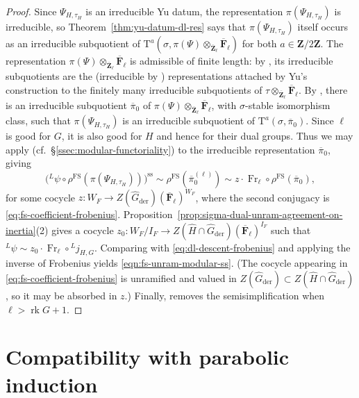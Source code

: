 \documentclass[reqno]{amsart}
\numberwithin{equation}{subsection}
\newcommand{\F}{\mathbf{F}}
\newcommand{\Z}{\mathbf{Z}}
\newcommand{\ol}[1]{\overline{#1}}
\newcommand{\wh}[1]{\widehat{#1}}
\newcommand{\co}{\colon}
\newcommand{\ld}{{}^L}
\DeclareMathOperator{\FS}{FS}
\DeclareMathOperator{\der}{der}
\DeclareMathOperator{\rk}{rk}
\DeclareMathOperator{\Fr}{Fr}
\newcommand{\rT}{\ensuremath{\mathrm{T}}\xspace}
\renewcommand{\ss}{\mathrm{ss}}
\theoremstyle{remark}
\numberwithin{equation}{subsection}
\numberwithin{figure}{subsection}
\begin{document}
\begin{proof}
Since $\Psi_{H,\tau_H}$ is an irreducible Yu datum, the representation $\pi(\Psi_{H,\tau_H})$ is irreducible, so Theorem~\ref{thm:yu-datum-dl-res} says that $\pi(\Psi_{H,\tau_H})$ itself occurs as an irreducible subquotient of $\rT^a(\sigma,\pi(\Psi)\otimes_{\ol\Z_\ell}\ol\F_\ell)$ for both $a \in \Z/2\Z$. The representation $\pi(\Psi)\otimes_{\ol\Z_\ell}\ol\F_\ell$ is admissible of finite length: by \cite[Lemma~7.3.1(1) and (2)]{CF26a}, its irreducible subquotients are the (irreducible by \cite[Theorem 3.1]{Fin22}) representations attached by Yu's construction to the finitely many irreducible subquotients of $\tau \otimes_{\ol\Z_\ell} \ol\F_\ell$. By \cite[Lemma~3.1.4]{Cot26b}, there is an irreducible subquotient $\ol\pi_0$ of $\pi(\Psi)\otimes_{\ol\Z_\ell}\ol\F_\ell$, with $\sigma$-stable isomorphism class, such that $\pi(\Psi_{H,\tau_H})$ is an irreducible subquotient of $\rT^a(\sigma, \ol\pi_0)$. Since $\ell$ is good for $G$, it is also good for $H$ and hence for their dual groups. Thus we may apply \cite[Theorem 1.3.1]{F24} (cf.\ \S\ref{ssec:modular-functoriality}) to the irreducible representation $\ol\pi_0$, giving
\begin{equation}\label{eq:dl-descent-frobenius}
\bigl(\ld\psi\circ\rho^{\FS}(\pi(\Psi_{H,\tau_H}))\bigr)^{\ss}
\sim\rho^{\FS}(\ol\pi_0^{(\ell)}) \sim z \cdot\Fr_\ell\circ\rho^{\FS}(\ol\pi_0),
\end{equation}
for some cocycle $z \co W_F \rightarrow Z(\wh G_{\der})(\ol\F_\ell)^{W_F}$,
where the second conjugacy is \eqref{eq:fs-coefficient-frobenius}. Proposition~\ref{prop:sigma-dual-unram-agreement-on-inertia}(2) gives a cocycle $z_0\co W_F/I_F\to Z(\wh H\cap\wh G_{\der})(\ol\F_\ell)^{I_F}$ such that $\ld\psi\sim z_0\cdot\Fr_\ell\circ\ld j_{H,G}$. Comparing with \eqref{eq:dl-descent-frobenius} and applying the inverse of Frobenius yields \eqref{eqn:fs-unram-modular-ss}. (The cocycle appearing in \eqref{eq:fs-coefficient-frobenius} is unramified and valued in $Z(\wh G_{\der})\subset Z(\wh H\cap\wh G_{\der})$, so it may be absorbed in $z$.) Finally, \cite[Lemma~10.1.6(3)]{CF26a} removes the semisimplification when $\ell>\rk G+1$.
\end{proof}





\section{Compatibility with parabolic induction}\label{ssec:modular-cuspidal-parabolic-induction}
\end{document}
